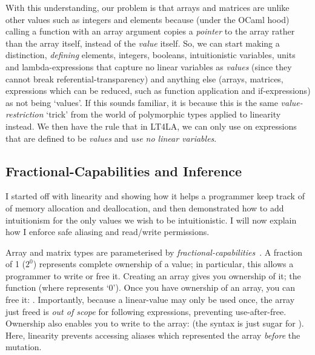 With this understanding, our problem is that arrays and matrices are unlike
other values such as integers and elements because (under the OCaml hood)
calling a function with an array argument copies a \emph{pointer} to the array
rather than the array itself, instead of the \emph{value} itself. So, we can
start making a distinction, \emph{defining} elements, integers, booleans,
intuitionistic variables, units and lambda-expressions that capture no linear
variables as \emph{values} (since they cannot break referential-transparency)
and anything else (arrays, matrices, expressions which can be reduced, such as
function application and if-expressions) as not being `values'. If this sounds
familiar, it is because this is the same \emph{value-restriction} `trick' from
the world of polymorphic types applied to linearity instead. We then have the
rule that in LT4LA, we can only use  on expressions that are
defined to be \emph{values} and \emph{use no linear variables}.

\subsection{Fractional-Capabilities and Inference}

I started off with linearity and showing how it helps a programmer keep track
of of memory allocation and deallocation, and then demonstrated how to add
intuitionism for the only values we wish to be intuitionistic. I will now
explain how I enforce safe aliasing and read/write permissions.

Array and matrix types are parameterised by
\emph{fractional-capabilities}~\cite{boyland}.  A fraction of 1 ($2^0$)
represents complete ownership of a value; in particular, this allows a
programmer to write or free it. Creating an array gives you ownership of it;
the function  (where  represents `0').
Once you have ownership of an array, you can free it: .  Importantly, because a linear-value may only be used once, the array
just freed is \emph{out of scope} for following expressions, preventing
use-after-free.  Ownership also enables you to write to the array:  (the syntax  is just sugar
for ). Here, linearity prevents accessing aliases which
represented the array \emph{before} the mutation.

